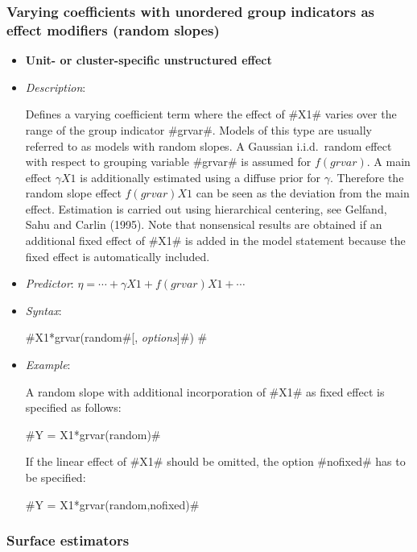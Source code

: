 

\subsubsection*{Varying coefficients with unordered group indicators as effect modifiers
(random slopes)}

\begin{itemize}
\item[]{\bf\sffamily Unit- or cluster-specific unstructured
effect}

\item[] {\em Description}:

Defines a varying coefficient term where the effect of #X1# varies
over the range of the group indicator #grvar#. Models of this type
are usually referred to as models with random slopes. A Gaussian
i.i.d.~random effect with respect to grouping variable #grvar# is
assumed for $f(grvar)$. A main effect $\gamma X1$ is additionally
estimated using a diffuse prior for $\gamma$. Therefore the random
slope effect $f(grvar)X1$ can be seen as the deviation from the
main effect. Estimation is carried out using hierarchical
centering, see Gelfand, Sahu and Carlin (1995). Note that
nonsensical results are obtained if an additional fixed effect of
#X1# is added in the model statement because the fixed effect is
automatically included. \item[] {\em Predictor}: $\eta = \cdots +
\gamma X1 + f(grvar)X1 + \cdots$ \item[] {\em Syntax}:

#X1*grvar(random#[, {\em options}]#) #
\item[] {\em Example}:

A random slope with additional incorporation of #X1# as fixed
effect is specified as follows:

#Y = X1*grvar(random)#

If the linear effect of #X1# should be omitted, the option
#nofixed# has to be specified:

#Y = X1*grvar(random,nofixed)#
\end{itemize}


\subsubsection*{Surface estimators}

